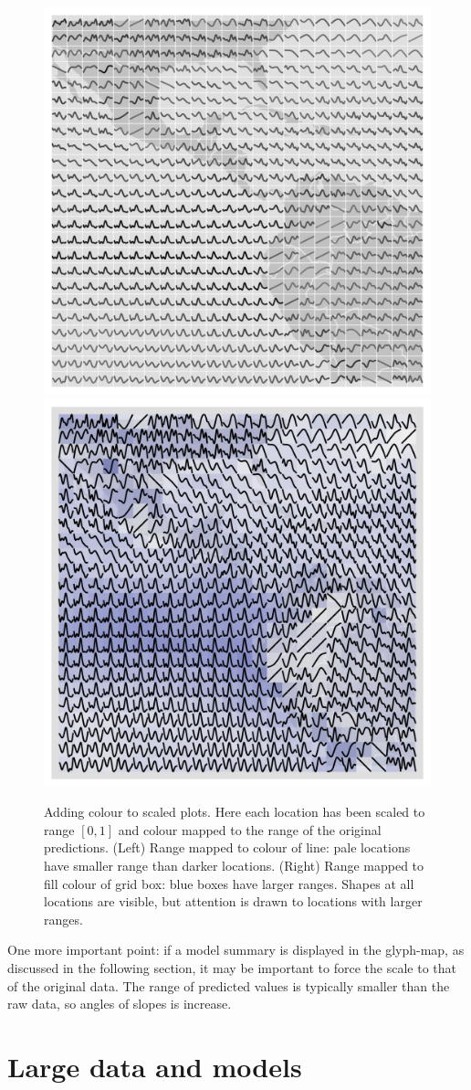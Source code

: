\documentclass[oneside]{article}
\begin{document}
\begin{figure}[htbp]
 \centering
 \includegraphics[width=0.5\linewidth]{month-rescale01-col}%
 \includegraphics[width=0.5\linewidth]{month-rescale01-fill}
 \caption{Adding colour to scaled plots. Here each location has been scaled to range $[0, 1]$ and colour mapped to the range of the original predictions. (Left) Range mapped to colour of line: pale locations have smaller range than darker locations. (Right) Range mapped to fill colour of grid box: blue boxes have larger ranges. Shapes at all locations are visible, but attention is drawn to locations with larger ranges.}
 \label{fig:scaling-col}
\end{figure}

One more important point: if a model summary is displayed in the glyph-map, as discussed in the following section, it may be important to force the scale to that of the original data. The range of predicted values is typically smaller than the raw data, so angles of slopes is increase.  


\section{Large data and models}
\label{sec:large-data}
\end{document}

